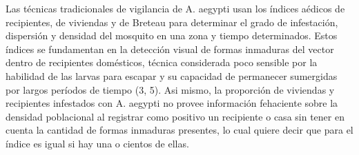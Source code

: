 Las técnicas tradicionales de vigilancia de A. aegypti usan los índices
aédicos de recipientes, de viviendas y de Breteau para determinar el grado
de infestación, dispersión y densidad del mosquito en una zona y tiempo
determinados. Estos índices se fundamentan en la detección visual de formas
inmaduras del vector dentro de recipientes domésticos, técnica considerada
poco sensible por la habilidad de las larvas para escapar y su capacidad de
permanecer sumergidas por largos períodos de tiempo (3, 5). Asi mismo, la
proporción de viviendas y recipientes infestados con A. aegypti no provee
información fehaciente sobre la densidad poblacional al registrar como
positivo un recipiente o casa sin tener en cuenta la cantidad de formas
inmaduras presentes, lo cual quiere decir que para el índice es igual
si hay una o cientos de ellas.
